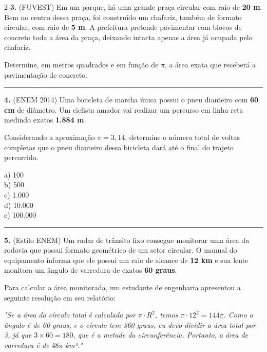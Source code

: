 \documentclass[11pt, a4paper]{article}
\begin{document}
\begin{multicols*}{2}
\textbf{3.} (FUVEST) Em um parque, há uma grande praça circular com raio de \textbf{20 m}. Bem no centro dessa praça, foi construído um chafariz, também de formato circular, com raio de \textbf{5 m}. A prefeitura pretende pavimentar com blocos de concreto toda a área da praça, deixando intacta apenas a área já ocupada pelo chafariz. 

Determine, em metros quadrados e em função de $\pi$, a área exata que receberá a pavimentação de concreto.

\vspace{2.5cm}

\vspace{0.4cm}
\noindent\textcolor{CorLinha}{\rule{\linewidth}{0.5pt}} 
\vspace{0.2cm}

\textbf{4.} (ENEM 2014) Uma bicicleta de marcha única possui o pneu dianteiro com \textbf{60 cm} de diâmetro. Um ciclista amador vai realizar um percurso em linha reta medindo exatos \textbf{1.884 m}. 

Considerando a aproximação $\pi = 3,14$, determine o número total de voltas completas que o pneu dianteiro dessa bicicleta dará até o final do trajeto percorrido.

a) 100\\[0.3cm]
b) 500\\[0.3cm]
c) 1.000\\[0.3cm]
d) 10.000\\[0.3cm]
e) 100.000\\[0.3cm]

\vspace{0.4cm}
\noindent\textcolor{CorLinha}{\rule{\linewidth}{0.5pt}} 
\vspace{0.2cm}

\textbf{5.} (Estilo ENEM) Um radar de trânsito fixo consegue monitorar uma área da rodovia que possui formato geométrico de um setor circular. O manual do equipamento informa que ele possui um raio de alcance de \textbf{12 km} e sua lente monitora um ângulo de varredura de exatos \textbf{60 graus}.

Para calcular a área monitorada, um estudante de engenharia apresentou a seguinte resolução em seu relatório:

\textit{"Se a área do círculo total é calculada por $\pi \cdot R^2$, temos $\pi \cdot 12^2 = 144\pi$. Como o ângulo é de 60 graus, e o círculo tem 360 graus, eu devo dividir a área total por 3, já que $3 \times 60 = 180$, que é a metade da circunferência. Portanto, a área de varredura é de $48\pi$ km²."}


\end{multicols*}
\end{document}
